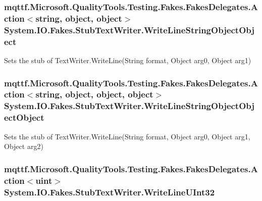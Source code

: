 \hypertarget{class_system_1_1_i_o_1_1_fakes_1_1_stub_text_writer_a3a55c4d448ced63d24758f799b6235f7}{
\subsubsection[{Write\-Line\-String\-Object\-Object}]{\setlength{\rightskip}{0pt plus 5cm}mqttf.\-Microsoft.\-Quality\-Tools.\-Testing.\-Fakes.\-Fakes\-Delegates.\-Action$<$string, object, object$>$ System.\-I\-O.\-Fakes.\-Stub\-Text\-Writer.\-Write\-Line\-String\-Object\-Object}}\label{class_system_1_1_i_o_1_1_fakes_1_1_stub_text_writer_a3a55c4d448ced63d24758f799b6235f7}


Sets the stub of Text\-Writer.\-Write\-Line(\-String format, Object arg0, Object arg1)

\hypertarget{class_system_1_1_i_o_1_1_fakes_1_1_stub_text_writer_a6f5f921f7702604bd7311f01eacd9443}{
\subsubsection[{Write\-Line\-String\-Object\-Object\-Object}]{\setlength{\rightskip}{0pt plus 5cm}mqttf.\-Microsoft.\-Quality\-Tools.\-Testing.\-Fakes.\-Fakes\-Delegates.\-Action$<$string, object, object, object$>$ System.\-I\-O.\-Fakes.\-Stub\-Text\-Writer.\-Write\-Line\-String\-Object\-Object\-Object}}\label{class_system_1_1_i_o_1_1_fakes_1_1_stub_text_writer_a6f5f921f7702604bd7311f01eacd9443}


Sets the stub of Text\-Writer.\-Write\-Line(\-String format, Object arg0, Object arg1, Object arg2)

\hypertarget{class_system_1_1_i_o_1_1_fakes_1_1_stub_text_writer_aee7abfa315acf0286fc9d79d3b674013}{
\subsubsection[{Write\-Line\-U\-Int32}]{\setlength{\rightskip}{0pt plus 5cm}mqttf.\-Microsoft.\-Quality\-Tools.\-Testing.\-Fakes.\-Fakes\-Delegates.\-Action$<$uint$>$ System.\-I\-O.\-Fakes.\-Stub\-Text\-Writer.\-Write\-Line\-U\-Int32}}\label{class_system_1_1_i_o_1_1_fakes_1_1_stub_text_writer_aee7abfa315acf0286fc9d79d3b674013}


